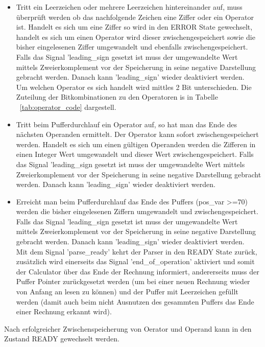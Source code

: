 \begin{itemize}
\begin{itemize}
\item Tritt ein Leerzeichen oder mehrere Leerzeichen hintereinander auf, muss überprüft werden ob das nachfolgende Zeichen eine Ziffer oder ein Operator ist. Handelt es sich um eine Ziffer so wird in den ERROR State gewechselt, handelt es sich um einen Operator wird dieser zwischengespeichert sowie die bisher eingelesenen Ziffer umgewandelt und ebenfalls zwischengespeichert. Falls das Signal 'leading\_sign gesetzt ist muss der umgewandelte Wert mittels Zweierkomplement vor der Speicherung in seine negative Darstellung gebracht werden. Danach kann 'leading\_sign' wieder deaktiviert werden. \\
Um welchen Operator es sich handelt wird mittles 2 Bit unterschieden. Die Zuteilung der Bitkombinationen zu den Operatoren is in Tabelle ~\ref{tab:operator_code} dargestell.
\item Tritt beim Pufferdurchlauf ein Operator auf, so hat man das Ende des nächsten Operanden ermittelt. Der Operator kann sofort zwischengespeichert werden. Handelt es sich um einen gültigen Operanden werden die Zifferen in einen Integer Wert umgewandelt und dieser Wert zwischengespeichert. Falls das Signal 'leading\_sign gesetzt ist muss der umgewandelte Wert mittels Zweierkomplement vor der Speicherung in seine negative Darstellung gebracht werden. Danach kann 'leading\_sign' wieder deaktiviert werden. 
\item Erreicht man beim Pufferdurchlauf das Ende des Puffers (pos\_var >=70) werden die bisher eingelesenen Ziffern umgewandelt und zwischengespeichert. Falls das Signal 'leading\_sign gesetzt ist muss der umgewandelte Wert mittels Zweierkomplement vor der Speicherung in seine negative Darstellung gebracht werden. Danach kann 'leading\_sign' wieder deaktiviert werden. \\
Mit dem Signal 'parse\_ready' kehrt der Parser in den READY State zurück, zusätzlich wird einerseits das Signal 'end\_of\_operation' aktiviert und somit der Calculator über das Ende der Rechnung informiert, andererseits muss der Puffer Pointer zurückgesetzt werden (um bei einer neuen Rechnung wieder von Anfang an lesen zu können) und der Puffer mit Leerzeichen gefüllt werden (damit auch beim nicht Ausnutzen des gesammten Puffers das Ende einer Rechnung erkannt wird). 
\end{itemize}

Nach erfolgreicher Zwischenspeicherung von Oerator und Operand kann in den Zustand READY gewechselt werden.  
\end{itemize}

